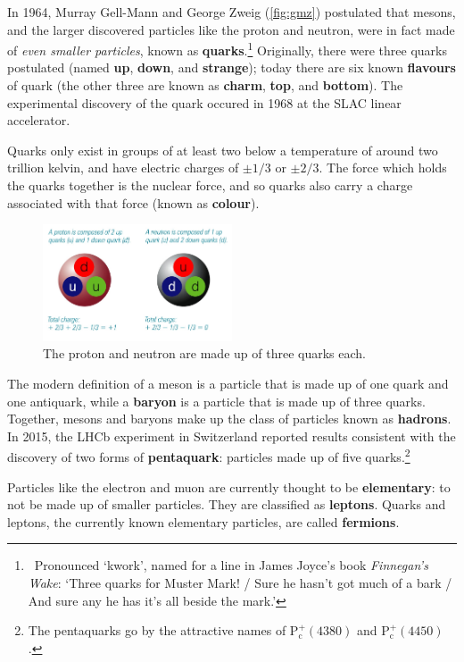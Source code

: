 \documentclass[a4paper]{amsbook}
\theoremstyle{definition}
\numberwithin{exercise}{chapter}
\numberwithin{exercise}{chapter}
\begin{document}
In 1964,  Murray Gell-Mann and George Zweig (\cref{fig:gmz}) postulated that mesons, and the larger discovered particles like the proton and neutron,
were in fact made of \emph{even smaller particles}, known as \textbf{quarks}.\footnote{~Pronounced `kwork', named for a line in James Joyce's
book \textit{Finnegan's Wake}: `Three quarks for Muster Mark! / Sure he hasn't got much of a bark / And sure any he has it's all beside the mark.'} Originally,
there were three quarks postulated (named \textbf{up}, \textbf{down}, and \textbf{strange}); today there are six known \textbf{flavours} of quark
(the other three are known as \textbf{charm}, \textbf{top}, and \textbf{bottom}). The experimental discovery of the quark occured in 1968 at the SLAC
linear accelerator.

Quarks only exist in groups of at least two below a temperature of around two trillion kelvin, and have electric charges of $ \pm 1/3 $ or $ \pm 2/3 $. The
force which holds the quarks together is the nuclear force, and so quarks also carry a charge associated with that force (known as \textbf{colour}).

\begin{figure}
  \centering
  \includegraphics[width=0.5\textwidth]{quarks}
  \caption{The proton and neutron are made up of three quarks each. \label{fig:quarks}}
\end{figure}

The modern definition of a meson is a particle that is made up of one quark and one antiquark, while  a \textbf{baryon} is a particle
that is made up of three quarks. Together, mesons and baryons make up the class of particles known as \textbf{hadrons}. In 2015, the LHCb
experiment in Switzerland reported results consistent with the discovery of two forms of \textbf{pentaquark}: particles made up of
five quarks.\footnote{The pentaquarks go by the attractive names of $ \mathrm{P}_\mathrm{c}^+(4380) $ and $ \mathrm{P}_\mathrm{c}^+(4450) $.}

Particles like the electron and muon are currently thought to be \textbf{elementary}: to not be made up of smaller particles. They
are classified as \textbf{leptons}. Quarks and leptons, the currently known elementary particles, are called \textbf{fermions}.
\end{document}
